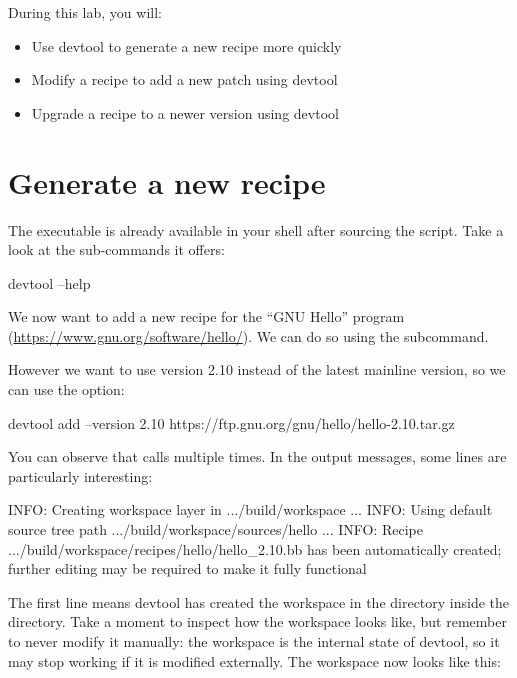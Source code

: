 
During this lab, you will:
\begin{itemize}
  \item Use devtool to generate a new recipe more quickly
  \item Modify a recipe to add a new patch using devtool
  \item Upgrade a recipe to a newer version using devtool
\end{itemize}

\section{Generate a new recipe}

The  executable is already available in your shell after
sourcing the  script. Take a look at the
sub-commands it offers:
\begin{bashinput}
devtool --help
\end{bashinput}

We now want to add a new recipe for the ``GNU Hello'' program
(\url{https://www.gnu.org/software/hello/}). We can do so using the
 subcommand.

However we want to use version 2.10 instead of the latest mainline version,
so we can use the  option:
\begin{bashinput}
devtool add --version 2.10 https://ftp.gnu.org/gnu/hello/hello-2.10.tar.gz
\end{bashinput}

You can observe that  calls  multiple times. In the output messages, some lines are particularly interesting:

\begin{bashinput}
INFO: Creating workspace layer in .../build/workspace
...
INFO: Using default source tree path .../build/workspace/sources/hello
...
INFO: Recipe .../build/workspace/recipes/hello/hello_2.10.bb has been automatically created; further editing may be required to make it fully functional
\end{bashinput}

The first  line means devtool has created the workspace in the
 directory inside the  directory. Take a moment
to inspect how the workspace looks like, but remember to never modify it
manually: the workspace is the internal state of devtool, so it may stop
working if it is modified externally. The workspace now looks like this:


